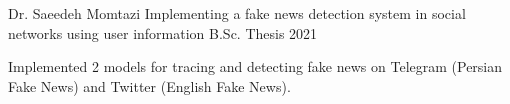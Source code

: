 

\begin{cventries}

  \cventry
  {Dr. Saeedeh Momtazi} %
  {Implementing a fake news detection system in social networks using user information} %
  {B.Sc. Thesis}
  {2021} %
  {
    \begin{cvitems} %
      \item {Implemented 2 models for tracing and detecting fake news on Telegram (Persian Fake News) and Twitter (English Fake News).}
    \end{cvitems}
  }

\end{cventries}
